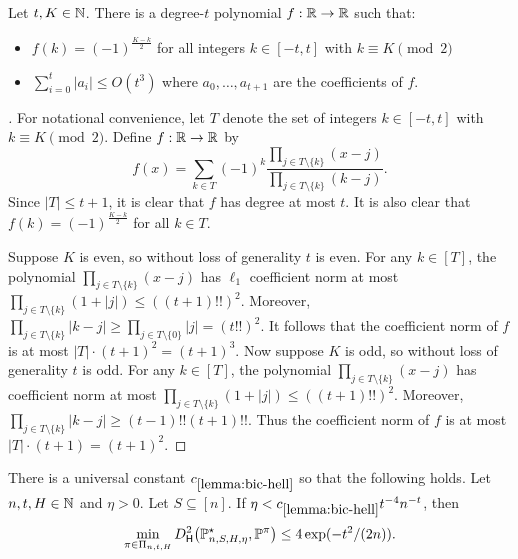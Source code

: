 \begin{lemma}\label{lemma:polynomial-interpolation}
Let $t,K \in \mathbb{N}$. There is a degree-$t$ polynomial $f: \mathbb{R} \to \mathbb{R}$ such that:
\begin{itemize}
\item $f(k) = (-1)^{\frac{K-k}{2}}$ for all integers $k \in [-t,t]$ with $k \equiv K \pmod{2}$
\item $\sum_{i=0}^{t} |a_i| \leq O(t^3)$ where $a_0,\dots,a_{t+1}$ are the coefficients of $f$.
\end{itemize}
\end{lemma}

\begin{proof}[]
For notational convenience, let $T$ denote the set of integers $k \in [-t,t]$ with $k \equiv K \pmod{2}$. Define $f:\mathbb{R} \to \mathbb{R}$ by
\[f(x) = \sum_{k \in T} (-1)^k \frac{\prod_{j \in T \setminus \{k\}} (x - j)}{\prod_{j \in T \setminus \{k\}} (k-j)}.\]
Since $|T| \leq t+1$, it is clear that $f$ has degree at most $t$. It is also clear that $f(k) = (-1)^{\frac{K-k}{2}}$ for all $k \in T$. 

Suppose $K$ is even, so without loss of generality $t$ is even. For any $k \in [T]$, the polynomial $\prod_{j \in T \setminus \{k\}} (x-j)$ has $\ell_1$ coefficient norm at most $\prod_{j \in T \setminus \{k\}} (1 + |j|) \leq ((t+1)!!)^2$. Moreover, $\prod_{j \in T \setminus \{k\}} |k-j| \geq \prod_{j \in T \setminus \{0\}} |j| = (t!!)^2$. It follows that the coefficient norm of $f$ is at most $|T| \cdot (t+1)^2 = (t+1)^3$. Now suppose $K$ is odd, so without loss of generality $t$ is odd. For any $k \in [T]$, the polynomial $\prod_{j \in T \setminus \{k\}} (x-j)$ has coefficient norm at most $\prod_{j \in T \setminus \{k\}} (1 + |j|) \leq ((t+1)!!)^2$. Moreover, $\prod_{j \in T \setminus \{k\}} |k-j| \geq (t-1)!!(t+1)!!$. Thus the coefficient norm of $f$ is at most $|T| \cdot (t+1) = (t+1)^2$.
\end{proof}



\begin{lemma}\label{lemma:bic-hell}
There is a universal constant $c_{\ref{lemma:bic-hell}}$ so that the following holds. Let $n,t,H \in \mathbb{N}$ and $\eta>0$. Let $S \subseteq [n]$. If $\eta < c_{\ref{lemma:bic-hell}} t^{-4} n^{-t}$, then
\[\min_{\pi \in \Pi_{n,t,H}} \Dhels{\BP^\st_{n,S,H,\eta}}{\BP^\pi} \leq 4\exp(-t^2/(2n)).\]
\end{lemma}

